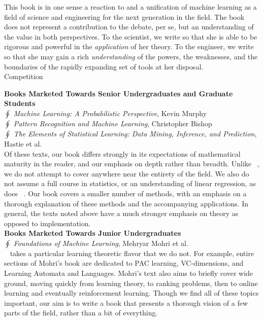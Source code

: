 \documentclass[10pt]{article}
\newenvironment{changemargin}[2]{%
\begin{list}{}{%
\setlength{\topsep}{0pt}%
\setlength{\leftmargin}{#1}%
\setlength{\rightmargin}{#2}%
\setlength{\listparindent}{\parindent}%
\setlength{\itemindent}{\parindent}%
\setlength{\parsep}{\parskip}%
}%
\item[]}{\end{list}}
\renewcommand{\it}{\textit}
\begin{document}
\begin{changemargin}{+-1cm}{-3cm}
This book is in one sense a reaction to and a unification of machine learning as a field of science and engineering for the next generation in the field. The book does not represent a contribution to the debate, per se, but an understanding of the value in both perspectives. To the scientist, we write so that she is able to be rigorous and powerful in the \it{application} of her theory. To the engineer, we write so that she may gain a rich \it{understanding} of the powers, the weaknesses, and the boundaries of the rapidly expanding set of tools at her disposal. \\

\newpage
\noindent
\large{Competition}\\
\small

\textbf{Books Marketed Towards Senior Undergraduates and Graduate Students} \\

$\oint$ \it{Machine Learning: A Probabilistic Perspective}, Kevin Murphy \\
$\oint$ \it{Pattern Recognition and Machine Learning}, Christopher Bishop \\
$\oint$ \it{The Elements of Statistical Learning: Data Mining, Inference, and Prediction}, Hastie et al. \\

Of these texts, our book differs strongly in its expectations of mathematical maturity in the reader, and our emphasis on depth rather than breadth. Unlike ~\cite{murphy2012machine}, we do not attempt to cover anywhere near the entirety of the field. We also do not assume a full course in statistics, or an understanding of linear regression, as does ~\cite{hastie2013elements}. Our book covers a smaller number of methods, with an emphasis on a thorough explanation of these methods and the accompanying applications. In general, the texts noted above have a much stronger emphasis on theory as opposed to implementation. \\

\textbf{Books Marketed Towards Junior Undergraduates} \\

$\oint$ \it{Foundations of Machine Learning}, Mehryar Mohri et al. \\

~\cite{mohri2018foundations} takes a particular learning theoretic flavor that we do not. For example, entire sections of Mohri's book are dedicated to PAC learning, VC-dimensions, and Learning Automata and Languages. Mohri's text also aims to briefly cover wide ground, moving quickly from learning theory, to ranking problems, then to online learning and eventually reinforcement learning. Though we find all of these topics important, our aim is to write a book that presents a thorough vision of a few parts of the field, rather than a bit of everything.\\


\end{changemargin}
\end{document}
